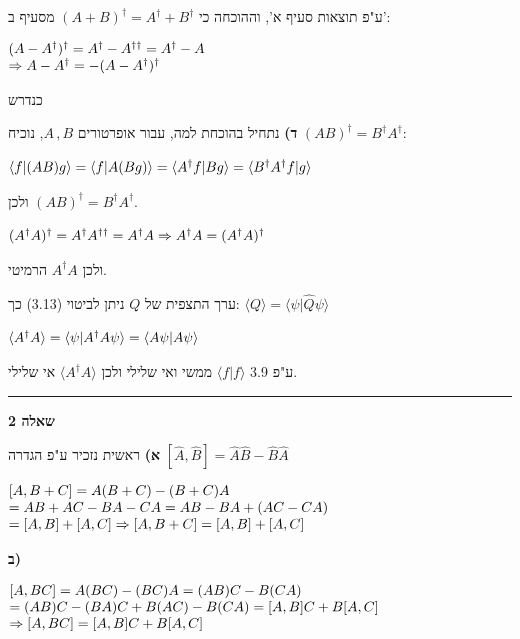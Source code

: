 \documentclass[14pt]{extarticle}
\makeatletter
\newenvironment{lefteqs}{%
    \begin{english}%
    \begin{flushleft}%
    \renewcommand{\arraystretch}{1.3}%
    $\begin{array}{@{}l@{}}%
}{%
    \end{array}$%
    \end{flushleft}%
    \end{english}%
}
\makeatother
\begin{document}
ע"פ תוצאות סעיף א', וההוכחה כי $(A+B)^\dagger = A^\dagger + B^\dagger$ מסעיף ב':
\begin{lefteqs}
    (A-A^\dagger)^\dagger = A^\dagger - A^{\dagger \dagger} = A^\dagger - A \\
    \Rightarrow A-A^\dagger = -(A-A^\dagger)^\dagger
\end{lefteqs}
כנדרש

\textbf{ד)}
נתחיל בהוכחת למה, עבור אופרטורים $A\, , B$, נוכיח $(AB)^\dagger = B^\dagger A^\dagger$:
\begin{lefteqs}
    \langle f | (AB)g\rangle = \langle f | A(Bg) \rangle = \langle A^\dagger f | Bg \rangle = \langle B^\dagger A^\dagger f | g \rangle
\end{lefteqs}
ולכן $(AB)^\dagger = B^\dagger A^\dagger$.
\begin{lefteqs}
    (A^\dagger A)^\dagger = A^\dagger A^{\dagger \dagger} = A^\dagger A \Rightarrow A^\dagger A = (A^\dagger A)^\dagger
\end{lefteqs}
ולכן $A^\dagger A$ הרמיטי.

ערך התצפית של $Q$ ניתן לביטוי (3.13) כך: $\langle Q \rangle = \langle \psi | \hat{Q} \psi \rangle$

\begin{lefteqs}
    \langle A^\dagger A \rangle = \langle \psi | A^\dagger A \psi \rangle = \langle A\psi | A\psi \rangle \\
\end{lefteqs}
ע"פ 3.9 $\langle f | f \rangle$ ממשי ואי שלילי ולכן $\langle A^\dagger A \rangle$ אי שלילי.

\vspace{3em}
\hrule
\vspace{2em}

\textbf{\large שאלה 2}

\textbf{א)}
ראשית נזכיר ע"פ הגדרה $[\hat{A},\hat{B}]=\hat{A}\hat{B}-\hat{B}\hat{A}$

\begin{lefteqs}
    [A,B+C] = A(B+C) - (B+C)A \\
    = AB + AC - BA - CA = AB -BA + (AC -CA) \\
    = [A,B] + [A,C] \Rightarrow [A,B+C] = [A,B] + [A,C]  
\end{lefteqs}

\textbf{ב)}

\begin{lefteqs}
    [A,BC] = A(BC) - (BC)A = (AB)C - B(CA) \\
    = (AB)C - (BA)C + B(AC) - B(CA) = [A,B]C + B[A,C] \\
    \Rightarrow [A,BC] = [A,B]C + B[A,C]
\end{lefteqs}
\end{document}
